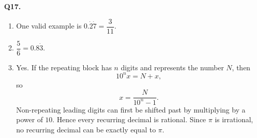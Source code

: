 \documentclass[12pt,a4paper]{article}
\begin{document}
\medskip
\noindent\textbf{Q17.}
\begin{enumerate}[label=(\alph*),leftmargin=*]
\item One valid example is $0.\dot{2}\dot{7}=\dfrac{3}{11}$.
\item $\dfrac56=0.8\dot{3}$.
\item Yes. If the repeating block has $n$ digits and represents the number $N$, then
\[
10^n x=N+x,
\]
so
\[
x=\frac{N}{10^n-1}.
\]
Non-repeating leading digits can first be shifted past by multiplying by a power of $10$. Hence every recurring decimal is rational. Since $\pi$ is irrational, no recurring decimal can be exactly equal to $\pi$.
\end{enumerate}
\end{document}
